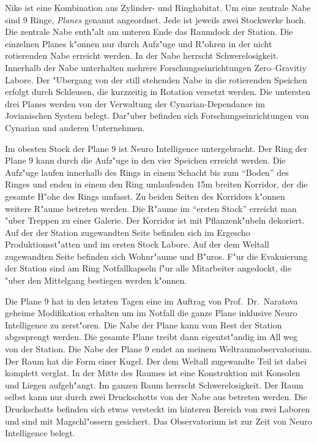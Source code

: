 
Nike ist eine Kombination aus Zylinder- und Ringhabitat. Um eine zentrale Nabe sind 9 Ringe, \emph{Planes} genannt angeordnet. Jede ist jeweils zwei Stockwerke hoch. Die zentrale Nabe enth"alt am unteren Ende das Raumdock der Station.  Die einzelnen Planes k"onnen nur durch Aufz"uge und R"ohren in der nicht rotierenden Nabe erreicht werden. In der Nabe herrscht Schwerelosigkeit. Innerhalb der Nabe unterhalten mehrere Forschungseinrichtungen Zero--Gravitiy Labore. Der "Ubergang von der still stehenden Nabe in die rotierenden Speichen erfolgt durch Schleusen, die kurzzeitig in Rotation versetzt werden. Die untersten drei Planes werden von der Verwaltung der Cynarian-Dependance im Jovianischen System belegt. Dar"uber befinden sich Forschungseinrichtungen von Cynarian und anderen Unternehmen.

Im obesten Stock der Plane 9 ist Neuro Intelligence untergebracht. Der Ring der Plane 9 kann durch die Aufz"uge in den vier Speichen erreicht werden. Die Aufz"uge laufen innerhalb des Rings in einem Schacht bis zum "`Boden"' des Ringes und enden in einem den Ring umlaufenden 15m breiten Korridor, der die gesamte H"ohe des Rings umfasst. Zu beiden Seiten des Korridors k"onnen weitere R"aume betreten werden. Die R"aume im "`ersten Stock"' erreicht man "uber Treppen zu einer Galerie. Der Korridor ist mit Pflanzenk"ubeln dekoriert. Auf der der Station zugewandten Seite befinden sich im Ergescho\3 Produktionsst"atten und im ersten Stock Labore. Auf der dem Weltall zugewandten Seite befinden sich Wohnr"aume und B"uros. F"ur die Evakuierung der Station sind am Ring Notfallkapseln f"ur alle Mitarbeiter angedockt, die "uber den Mittelgang bestiegen werden k"onnen.

Die Plane 9 hat in den letzten Tagen eine im Auftrag von Prof.~Dr.~Naratova geheime Modifikation erhalten um im Notfall die ganze Plane inklusive Neuro Intelligence zu zerst"oren. Die Nabe der Plane kann vom Rest der Station abgesprengt werden. Die gesamte Plane treibt dann eigentst"andig im All weg von der Station. Die Nabe der Plane 9 endet an meinem Weltraumobservatorium. Der Raum hat die Form einer Kugel. Der dem Weltall zugewandte Teil ist dabei komplett vergla\3t. In der Mitte des Raumes ist eine Konstruktion mit Konsolen und Liegen aufgeh"angt. Im ganzen Raum herrscht Schwerelosigkeit. Der Raum selbst kann nur durch zwei Druckschotts von der Nabe aus betreten werden. Die Druckschotts befinden sich etwas versteckt im hinteren Bereich von zwei Laboren und sind mit Magschl"ossern gesichert. Das Observatorium ist zur Zeit von Neuro Intelligence belegt. 


